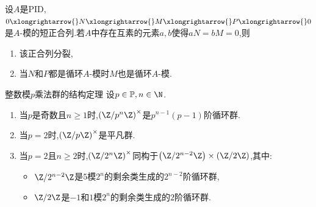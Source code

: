 \begin{lemma}{}{}
	设$A$是PID,$0\xlongrightarrow{}N\xlongrightarrow{}M\xlongrightarrow{}P\xlongrightarrow{}0$是$A$-模的短正合列.若$A$中存在互素的元素$a,b$使得$aN=bM=0$,则
	\begin{enumerate}
		\item 该正合列分裂,
		\item 当$N$和$P$都是循环$A$-模时$M$也是循环$A$-模.
	\end{enumerate}
\end{lemma}

\begin{theorem}{整数模$p$乘法群的结构定理}{}
	设$p\in\mathbb{P},n\in\N$.
	\begin{enumerate}
		\item 当$p$是奇数且$n\geq 1$时,$\left(\Z/p^{n}\Z\right)^{\times}$是$p^{n-1}\left(p-1\right)$阶循环群.
		\item 当$p=2$时,$\left(\Z/p\Z\right)^{\times}$是平凡群.
		\item 当$p=2$且$n\geq 2$时,$\left(\Z/2^{n}\Z\right)^{\times}$同构于$\left(\Z/2^{n-2}\Z\right)\times\left(\Z/2\Z\right)$,其中:
		\begin{itemize}
			\item $\Z/2^{n-2}\Z$是$5$模$2^{n}$的剩余类生成的$2^{n-2}$阶循环群,
			\item $\Z/2\Z$是$-1$和$1$模$2^{n}$的剩余类生成的$2$阶循环群.
		\end{itemize}
	\end{enumerate}
\end{theorem}

